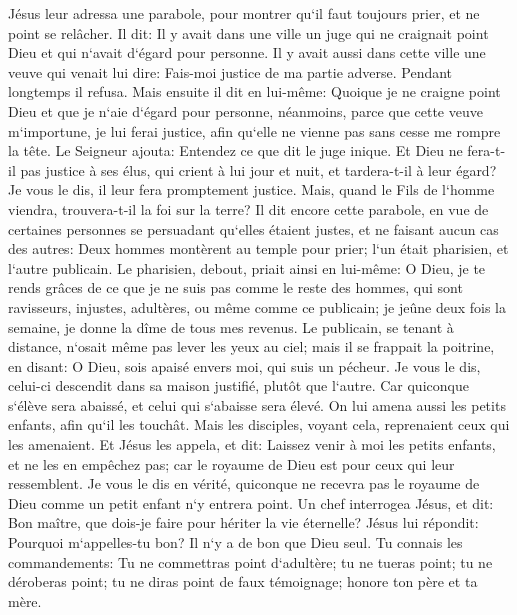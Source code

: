 \verse Jésus leur adressa une parabole, pour montrer qu`il faut toujours prier, et ne point se relâcher. 
\verse Il dit: Il y avait dans une ville un juge qui ne craignait point Dieu et qui n`avait d`égard pour personne. 
\verse Il y avait aussi dans cette ville une veuve qui venait lui dire: Fais-moi justice de ma partie adverse. 
\verse Pendant longtemps il refusa. Mais ensuite il dit en lui-même: Quoique je ne craigne point Dieu et que je n`aie d`égard pour personne, 
\verse néanmoins, parce que cette veuve m`importune, je lui ferai justice, afin qu`elle ne vienne pas sans cesse me rompre la tête. 
\verse Le Seigneur ajouta: Entendez ce que dit le juge inique. 
\verse Et Dieu ne fera-t-il pas justice à ses élus, qui crient à lui jour et nuit, et tardera-t-il à leur égard? 
\verse Je vous le dis, il leur fera promptement justice. Mais, quand le Fils de l`homme viendra, trouvera-t-il la foi sur la terre? 
\verse Il dit encore cette parabole, en vue de certaines personnes se persuadant qu`elles étaient justes, et ne faisant aucun cas des autres: 
\verse Deux hommes montèrent au temple pour prier; l`un était pharisien, et l`autre publicain. 
\verse Le pharisien, debout, priait ainsi en lui-même: O Dieu, je te rends grâces de ce que je ne suis pas comme le reste des hommes, qui sont ravisseurs, injustes, adultères, ou même comme ce publicain; 
\verse je jeûne deux fois la semaine, je donne la dîme de tous mes revenus. 
\verse Le publicain, se tenant à distance, n`osait même pas lever les yeux au ciel; mais il se frappait la poitrine, en disant: O Dieu, sois apaisé envers moi, qui suis un pécheur. 
\verse Je vous le dis, celui-ci descendit dans sa maison justifié, plutôt que l`autre. Car quiconque s`élève sera abaissé, et celui qui s`abaisse sera élevé. 
\verse On lui amena aussi les petits enfants, afin qu`il les touchât. Mais les disciples, voyant cela, reprenaient ceux qui les amenaient. 
\verse Et Jésus les appela, et dit: Laissez venir à moi les petits enfants, et ne les en empêchez pas; car le royaume de Dieu est pour ceux qui leur ressemblent. 
\verse Je vous le dis en vérité, quiconque ne recevra pas le royaume de Dieu comme un petit enfant n`y entrera point. 
\verse Un chef interrogea Jésus, et dit: Bon maître, que dois-je faire pour hériter la vie éternelle? 
\verse Jésus lui répondit: Pourquoi m`appelles-tu bon? Il n`y a de bon que Dieu seul. 
\verse Tu connais les commandements: Tu ne commettras point d`adultère; tu ne tueras point; tu ne déroberas point; tu ne diras point de faux témoignage; honore ton père et ta mère. 
